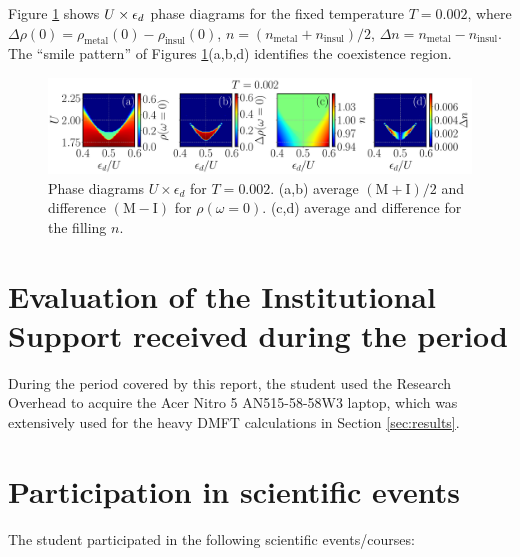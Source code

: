 \documentclass[12pt]{report}
\begin{document}
Figure \ref{fig:T0002-butterfly} shows $U \times \epsilon_d$ phase diagrams for the fixed temperature $T = 0.002$, where $\Delta \rho(0) = \rho_{\text{metal}}(0) - \rho_{\text{insul}}(0)$, $n = (n_{\text{metal}} + n_{\text{insul}})/2$, $\Delta n = n_{\text{metal}} - n_{\text{insul}}$. The ``smile pattern'' of Figures \ref{fig:T0002-butterfly}(a,b,d) identifies the coexistence region.

\begin{figure}[H]
\centering
\includegraphics[width=\columnwidth]{fig/fig4-abcd-eps-converted-to.pdf}
\caption{Phase diagrams $U \times \epsilon_d$ for $T=0.002$. (a,b) average $(\text{M}+\text{I})/2$ and difference $(\text{M}-\text{I})$ for $\rho(\omega=0)$. (c,d) average and difference for the filling $n$. }
\label{fig:T0002-butterfly}
\end{figure}




\pagebreak


\chapter{Evaluation of the Institutional Support received during the period} \label{chp:apoioInst}

During the period covered by this report, the student used the Research Overhead to acquire the Acer Nitro 5 AN515-58-58W3 laptop, which was extensively used for the heavy DMFT calculations in Section \ref{sec:results}.


\chapter{Participation in scientific events} \label{chp:particEvento}

The student participated in the following scientific events/courses:
\end{document}
